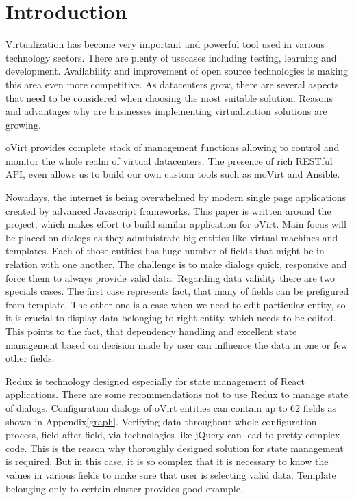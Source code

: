\renewcommand{\lstlistingname}{Code sample}
\chapter{Introduction}
Virtualization has become very important and powerful tool used in various technology sectors. There are plenty of usecases including testing, learning and development. Availability and improvement of open source technologies is making this area even more competitive. As datacenters grow, there are several aspects that need to be considered when choosing the most suitable solution. Reasons and advantages why are businesses implementing virtualization solutions are growing\cite{virtualization}.

oVirt\cite{oVirt} provides complete stack of management functions allowing to control and monitor the whole realm of virtual datacenters. The presence of rich RESTful API, even allows us to build our own custom tools such as moVirt\cite{moVirt} and Ansible\cite{Ansible}. 

Nowadays, the internet is being overwhelmed by modern single page applications created by advanced Javascript frameworks. This paper is written around the project, which makes effort to build similar application for oVirt. Main focus will be placed on dialogs as they administrate big entities like virtual machines and templates. Each of those entities has huge number of fields that might be in relation with one another. The challenge is to make dialogs quick, responsive and force them to always provide valid data. Regarding data validity there are two specials cases. The first case represents fact, that many of fields can be prefigured from template. The other one is a case when we need to edit particular entity, so it is crucial to display data belonging to right entity, which needs to be edited. This points to the fact, that dependency handling and excellent state management based on decision made by user can influence the data in one or few other fields.

Redux is technology designed especially for state management of React\cite{React} applications. There are some recommendations not to use Redux\cite{Redux} to manage state of dialogs. Configuration dialogs of oVirt entities can contain up to 62 fields as shown in Appendix\ref{graph}. Verifying data throughout whole configuration process, field after field, via technologies like jQuery can lead to pretty complex code. This is the reason why thoroughly designed solution for state management is required. But in this case, it is so complex that it is necessary to know the values in various fields to make sure that user is selecting valid data. Template belonging only to certain cluster provides good example.

